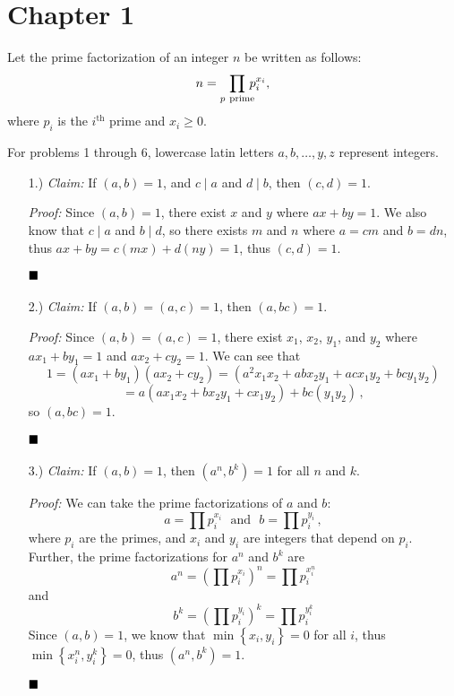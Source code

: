 \documentclass[12pt]{article}
\newcommand{\claim}{\textit{Claim: }}
\newcommand{\proof}{\textit{Proof: }}
\newcommand{\done}{
    \ensuremath{\strut\hfill\blacksquare}
}
\newcommand{\sep}[1]{\ \ \ \text{#1}\ \ \ }
\newcommand{\braces}[1]{\left\{#1\right\}}
\newcommand{\parens}[1]{\left(#1\right)}
\begin{document}

    \pagestyle{fancy}

    \section*{Chapter 1}

    Let the prime factorization of an integer $n$ be written as follows:
    \[ n = \prod_{p \ \text{prime}}\kern-2mm p_i^{x_i} , \]
    where $p_i$ is the $i^{\text{th}}$ prime and $x_i \geq 0$.

    For problems 1 through 6, lowercase latin letters $a,b,\dots,y,z$
    represent integers.
    
    \begin{itemize}
        \item [1.)] \claim If $(a,b)=1$, and $c\mid a$ and $d\mid b$, then
        $(c,d)=1$.
        
        \proof Since $(a,b)=1$, there exist $x$ and $y$ where $ax+by=1$.
        We also know that $c\mid a $ and $b\mid d$, so there exists $m$ and
        $n$ where $a=cm$ and $b=dn$, thus $ax+by=c(mx)+d(ny)=1$, thus
        $(c,d)=1$.
        \done

        \item [2.)] \claim If $(a,b)=(a,c)=1$, then $(a,bc)=1$.

        \proof Since $(a,b)=(a,c)=1$, there exist $x_1$, $x_2$, $y_1$, and
        $y_2$ where $ax_1+by_1=1$ and $ax_2+cy_2=1$.
        We can see that
        \[
            1 = (ax_1+by_1)(ax_2+cy_2)
            = (a^2x_1x_2+abx_2y_1+acx_1y_2+bcy_1y_2)
        \]\[
            = a(ax_1x_2+bx_2y_1+cx_1y_2)+bc(y_1y_2)
            \, ,
        \]
        so $(a,bc)=1$.
        \done

        \item [3.)] \claim If $(a,b) = 1$, then $(a^n,b^k) = 1$ for all $n$ and $k$.
        
        \proof We can take the prime factorizations of $a$ and $b$:
        \[
            a
            = \prod p_i^{x_i}
            \sep{and}
            b
            = \prod p_i^{y_i}
            \, ,
        \]
        where $p_i$ are the primes, and $x_i$ and $y_i$ are integers that
        depend on $p_i$.
        Further, the prime factorizations for $a^n$ and $b^k$ are
        \[
            a^n
            = \parens{\prod p_i^{x_i}}^n
            = \prod p_i^{x_i^n}
        \]
        and
        \[
            b^k
            = \parens{\prod p_i^{y_i}}^k
            = \prod p_i^{y_i^k}
        \]
        Since $(a,b)=1$, we know that $\min \braces{x_i,y_i}=0$ for all $i$,
        thus $\min \braces{x_i^n,y_i^k}=0$, thus $(a^n,b^k)=1$.
        \done


\end{itemize}
\end{document}
